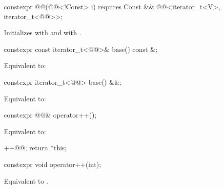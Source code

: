 %
\begin{itemdecl}
constexpr @@(@@<!Const> i)
  requires Const && @@<iterator_t<V>, iterator_t<@@>>;
\end{itemdecl}

\begin{itemdescr}
\pnum
\effects
Initializes  with  and
 with .
\end{itemdescr}

%
\begin{itemdecl}
constexpr const iterator_t<@@>& base() const &;
\end{itemdecl}

\begin{itemdescr}
\pnum
\effects
Equivalent to: 
\end{itemdescr}

%
\begin{itemdecl}
constexpr iterator_t<@@> base() &&;
\end{itemdecl}

\begin{itemdescr}
\pnum
\effects
Equivalent to: 
\end{itemdescr}

%
\begin{itemdecl}
constexpr @@& operator++();
\end{itemdecl}

\begin{itemdescr}
\pnum
\effects
Equivalent to:
\begin{codeblock}
++@@;
return *this;
\end{codeblock}
\end{itemdescr}

%
\begin{itemdecl}
constexpr void operator++(int);
\end{itemdecl}

\begin{itemdescr}
\pnum
\effects
Equivalent to .
\end{itemdescr}

